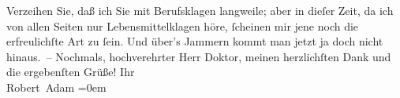 \begin{ledgroupsized}[t]{13cm}
           \pstart
           Verzeihen Sie, daß ich Sie mit Berufsklagen langweile; aber in dieſer Zeit, da
                    ich von allen Seiten nur Lebensmittelklagen höre, ſcheinen mir jene noch die
                    erfreulichſte Art zu ſein. Und über’s Jammern kommt man jetzt ja doch nicht
                    hinaus. –\pend
           \pstart
           Nochmals, hochverehrter Herr Doktor, meinen herzlichſten Dank und die ergebenſten
                    Grüße!\pend
           \pstart
           Ihr{\\[\baselineskip]}\spacefill\mbox{Robert Adam}\pend
           \leftskip=0em{}
         
         \endnumbering{}\end{ledgroupsized}  \newcommand{\dateiname}{L02268}\newcommand{\titel}{Robert Adam an Arthur Schnitzler, 23. 8. 1917}\newcommand{\editorInnen}{Martin Anton Müller und Gerd-Hermann Susen}
      